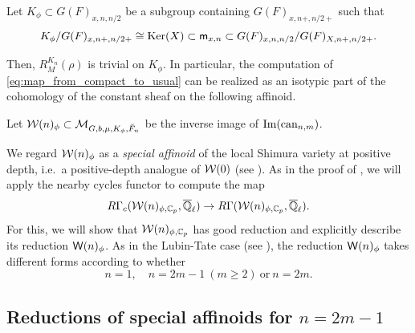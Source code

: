 \documentclass[12pt,reqno]{amsart}
\begin{document}
\begin{defi}
    Let $K_\phi \subset G(F)_{x, n, n/2}$ be a subgroup containing $G(F)_{x, n+, n/2 +}$ such that 
    \[
        K_\phi / G(F)_{x, n+, n/2+} \cong {\operatorname{Ker}}(X) \subset {\mathsf{m}}_{x, n} \subset G(F)_{x, n, n/2} / G(F)_{X, n+, n/2+}. 
    \]
\end{defi}

Then, $R^{K_n}_M(\rho)$ is trivial on $K_\phi$. %
In particular, the computation of \eqref{eq:map_from_compact_to_usual} can be realized as an isotypic part of the cohomology of the constant sheaf on the following affinoid. 

\begin{defi} \label{defi:special_affinoids_positive_depth}
    Let ${\mathcal{W}}(n)_\phi \subset {\mathcal{M}}_{G, b, \mu, K_\phi, \breve{F}_n}$ be the inverse image of ${\operatorname{Im}}({\operatorname{can}}_{n, m})$. 
\end{defi}

We regard ${\mathcal{W}}(n)_\phi$ as a \textit{special affinoid} of the local Shimura variety at positive depth, i.e.\ a positive-depth analogue of ${\mathcal{W}}(0)$ (see ). As in the proof of , we will apply the nearby cycles functor to compute the map
\[
    R\Gamma_c({\mathcal{W}}(n)_{\phi, \mathbb{C}_p}, {\overline{\mathbb{Q}}_\ell}) \to R\Gamma({\mathcal{W}}(n)_{\phi, \mathbb{C}_p}, {\overline{\mathbb{Q}}_\ell}). 
\]
For this, we will show that ${\mathcal{W}}(n)_{\phi, \mathbb{C}_p}$ has good reduction and explicitly describe its reduction ${\mathsf{W}}(n)_\phi$. As in the Lubin-Tate case (see \cite[Section 3.8, 3.9]{BW16}), the reduction ${\mathsf{W}}(n)_\phi$ takes different forms according to whether
\[
    n = 1, \quad n = 2m - 1 \ (m \geq 2) \ \text{or} \ n = 2m. 
\]


\subsection{Reductions of special affinoids for $n = 2m - 1$} \label{ssec:reduction_odd}
\end{document}
